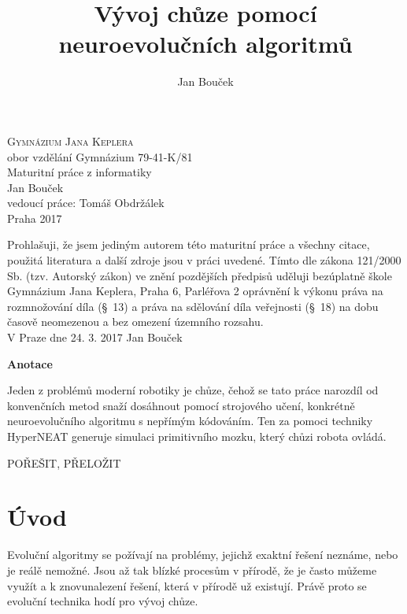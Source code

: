 \documentclass[a4]{article}
\begin{document}
\begin{titlepage}
\begin{center}
{\Huge\textsc{Gymnázium Jana Keplera}\\}
{\large{obor vzdělání Gymnázium 79-41-K/81}\\[0.7cm]}
{\huge{Maturitní práce z informatiky}\\[0.5cm]}
{\Large{Jan Bouček}\\}
{\large{vedoucí práce: Tomáš Obdržálek}\\}
{\large{Praha 2017}}
\end{center}
\end{titlepage}

\newpage
Prohlašuji, že jsem jediným autorem této maturitní práce a všechny citace, použitá literatura a další zdroje jsou v práci uvedené. Tímto dle zákona 121/2000 Sb. (tzv. Autorský zákon) ve znění pozdějších předpisů uděluji bezúplatně škole Gymnázium Jana Keplera, Praha 6, Parléřova 2 oprávnění k výkonu práva na rozmnožování díla (§~13) a práva na sdělování díla veřejnosti (§~18) na dobu časově neomezenou a bez omezení územního rozsahu.\\[0.7cm]
\vspace{10cm}
{\large{V Praze dne 24. 3. 2017} \hfill Jan Bouček}
\newpage
{\Large\textbf{Anotace}\par}
Jeden z problémů moderní robotiky je chůze, čehož se tato práce narozdíl od konvenčních metod snaží dosáhnout pomocí strojového učení, konkrétně neuroevolučního algoritmu s nepřímým kódováním. Ten za pomoci techniky HyperNEAT generuje simulaci primitivního mozku, který chůzi robota ovládá.\par

{\Huge{POŘEŠIT, PŘELOŽIT}}
\title{Vývoj chůze pomocí neuroevolučních algoritmů}
\author{Jan Bouček}
\date{}
\maketitle

\section{Úvod}

Evoluční algoritmy se požívají na problémy, jejichž exaktní řešení neznáme, nebo je reálě nemožné. Jsou až tak blízké procesům v přírodě, že je často můžeme využít a k znovunalezení řešení, která v přírodě už existují. Právě proto se evoluční technika hodí pro vývoj chůze.
\end{document}
